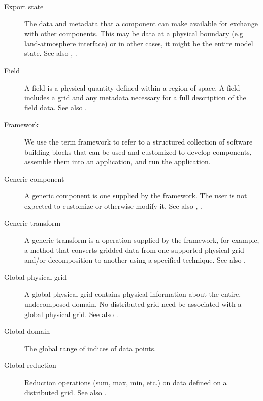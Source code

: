 \begin{description}
\item[Export state] \label{glos:ExportState} The data and metadata that 
  a component can make available for exchange with other components. 
  This may be data at a physical boundary (e.g land-atmosphere interface) 
  or in other cases, it might be the entire model state.  
  See also , 
  .

\item[Field] \label{glos:Field} A field is a physical quantity
  defined within a region of space.  A field includes a grid 
  and any metadata necessary for a full description of the field data.
  See also .

\item[Framework] \label{glos:Framework} We use the term framework to 
  refer to a structured collection of software building blocks that can be used 
  and customized to develop components, assemble them into an application, and 
  run the application.

\item[Generic component] \label{glos:GenericComp} A generic component
  is one supplied by the framework.  The user is not expected to 
  customize or otherwise modify it.  See also , 
  . 

\item[Generic transform] \label{glos:GenericTrans} A generic transform 
  is a operation supplied by the framework, for example, a method 
  that converts gridded data from one supported physical grid and/or 
  decomposition to another using a specified technique.  See also .

\item[Global physical grid] \label{glos:GlobPhysGrid} 
  A global physical grid contains physical information about the entire, 
  undecomposed domain.  No distributed grid need be associated with a global 
  physical grid. See also .  

\item[Global domain] \label{glos:GlobDomain}
  The global range of indices of data points.

\item[Global reduction] \label{glos:GlobReduction} 
  Reduction operations (sum, max, min, etc.) on data defined on a distributed 
  grid.  See also .


\end{description}
